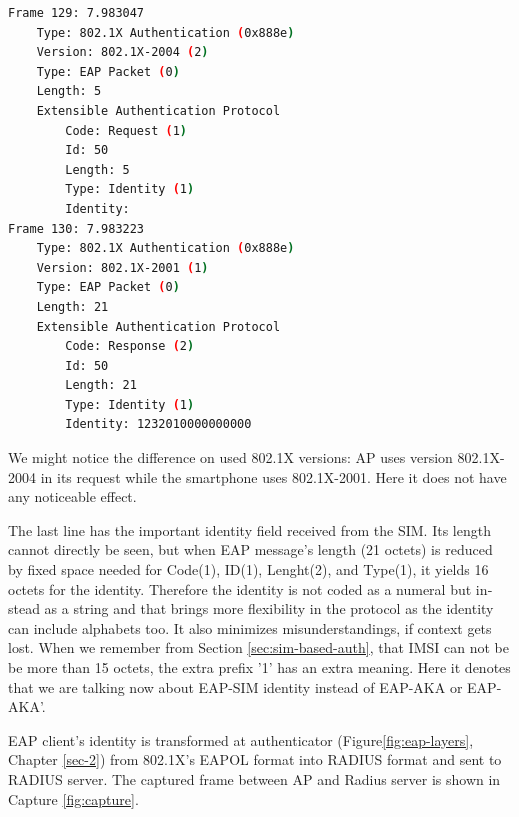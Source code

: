 \documentclass[12pt,a4paper,english]{tutthesis}
\begin{document}
\begin{otherlanguage}{english}
\renewcommand{\lstlistingname}{Capture}

\begin{lstlisting}[language=bash,
  label=capimsi,
  caption={First detailed indication of IMSI, captured from WPA2-supplicant}
]
Frame 129: 7.983047
    Type: 802.1X Authentication (0x888e)
    Version: 802.1X-2004 (2)
    Type: EAP Packet (0)
    Length: 5
    Extensible Authentication Protocol
        Code: Request (1)
        Id: 50
        Length: 5
        Type: Identity (1)
        Identity: 
Frame 130: 7.983223
    Type: 802.1X Authentication (0x888e)
    Version: 802.1X-2001 (1)
    Type: EAP Packet (0)
    Length: 21
    Extensible Authentication Protocol
        Code: Response (2)
        Id: 50
        Length: 21
        Type: Identity (1)
        Identity: 1232010000000000
\end{lstlisting}
\normalsize

We might notice the difference on used 802.1X versions: AP uses version
802.1X-2004 in its request while the smartphone uses 802.1X-2001. Here
it does not have any  noticeable effect.

The last line has the important identity field received from the SIM.
Its length cannot directly be seen, but when EAP message's length (21
octets) is reduced by fixed space needed for Code(1), ID(1),
Lenght(2), and Type(1), it yields 16 octets for the
identity. Therefore the identity is not coded as a 
numeral but instead as a string and that brings more flexibility in
the protocol as the identity can include alphabets too. It also
minimizes misunderstandings, if context gets lost. 
When we remember from Section \ref{sec:sim-based-auth}, that IMSI can not be
be more than 15 octets, the extra prefix '1' has an extra meaning.
Here it denotes that we are talking  now about EAP-SIM identity instead of
EAP-AKA or EAP-AKA'.





EAP client's identity is transformed at authenticator
(Figure\ref{fig:eap-layers}, Chapter \ref{sec-2}) from 802.1X's 
EAPOL format  into RADIUS format and
sent to RADIUS server. The captured frame between AP and Radius server is
shown
in Capture \ref{fig:capture}.



\end{otherlanguage}
\end{document}
